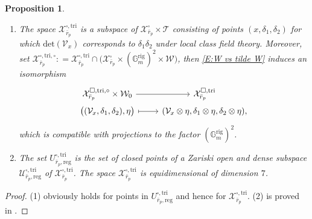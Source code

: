 \documentclass[12pt]{amsart}
\newtheorem{proposition}[subsection]{Proposition}
\theoremstyle{definition}
\numberwithin{equation}{subsection}
\def\calT{\mathcal{T}}
\def\calU{\mathcal{U}}
\def\calV{\mathcal{V}}
\def\calW{\mathcal{W}}
\def\calX{\mathcal{X}}
\def\GG{\mathbb{G}}
\renewcommand{\det}{\mathrm{det}}
\newcommand{\rig}{\mathrm{rig}}
\newcommand{\wt}{\mathrm{wt}}
\newcommand{\tri}{\mathrm{tri}}
\newcommand{\reg}{\mathrm{reg}}
\begin{document}
\begin{proposition}
\label{P:properties of trianguline deformation space}
\begin{enumerate}
\item The space $\calX_{\bar r_p}^{\square, \tri}$ is a subspace of $\calX_{\bar r_p}^\square \times \calT$ consisting of points $(x, \delta_1, \delta_2)$ for which $\det(\calV_x)$ corresponds to $\delta_1 \delta_2$ under local class field theory.
Moreover, set
$\calX_{\bar r_p}^{\square, \tri, \circ}: = \calX_{\bar r_p}^{\square, \tri} \cap \big( \calX_{\bar r_p} ^\square\times (\GG_m^\rig)^2 \times \calW\big)$, then \eqref{E:W vs tilde W} induces an isomorphism
$$
\begin{tikzcd}[row sep = 0pt]
\calX_{\bar r_p}^{\square, \tri, \circ} \times \calW_0 \ar[r] & \calX_{\bar r_p}^{\square, \tri}
\\
\big(
(\calV_x, \delta_1, \delta_2), \eta\big) \ar[r, mapsto] & (\calV_x \otimes \eta, \delta_1 \otimes \eta,\delta_2\otimes \eta),
\end{tikzcd}
$$
which is compatible with projections to the factor $(\GG_m^\rig)^2$.
\item The set $U_{\bar r_p, \reg}^{\square, \tri}$ is the set of closed points of a Zariski open and dense subspace $\calU_{\bar r_p, \reg}^{\square, \tri}$ of $\calX_{\bar r_p}^{\square, \tri}$. The space $\calX_{\bar r_p}^{\square, \tri}$ is equidimensional of dimension $7$.
\end{enumerate}
\end{proposition}
\begin{proof}
(1) obviously holds for points in $U_{\bar r_p,\reg}^{\square, \tri}$ and hence for $\calX_{\bar r_p}^{\square, \tri}$. (2) is proved in \cite[Th\'eor\`em~2.6]{breuil-hellmann-schraen}.
\end{proof}
\end{document}
